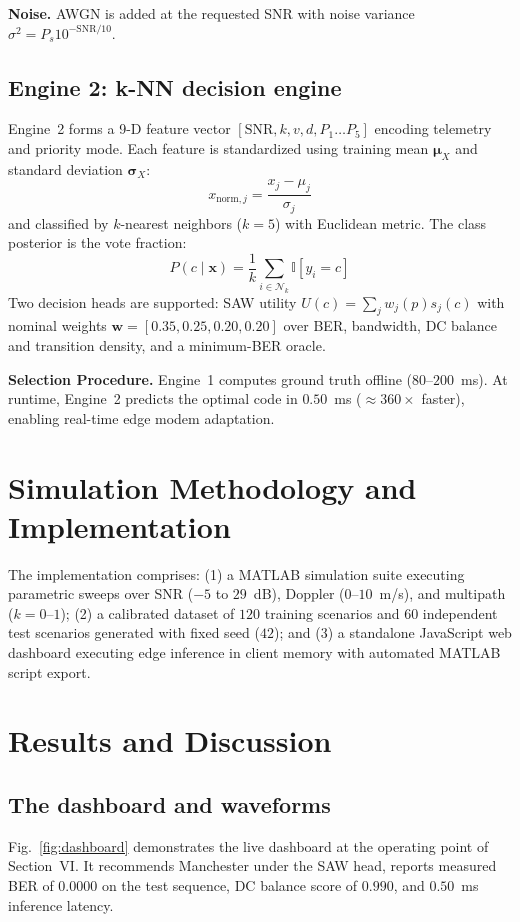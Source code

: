 \documentclass[conference]{IEEEtran}
\begin{document}
\textbf{Noise.} AWGN is added at the requested SNR with noise variance $\sigma^2 = P_s 10^{-\text{SNR}/10}$.

\subsection{Engine 2: k-NN decision engine}
Engine~2 forms a 9-D feature vector $[\text{SNR}, k, v, d, P_1 \dots P_5]$ encoding telemetry and priority mode. Each feature is standardized using training mean $\boldsymbol{\mu}_X$ and standard deviation $\boldsymbol{\sigma}_X$:
\begin{equation}
x_{\text{norm}, j} = \frac{x_j - \mu_j}{\sigma_j}
\end{equation}
and classified by $k$-nearest neighbors ($k=5$) with Euclidean metric. The class posterior is the vote fraction:
\begin{equation}
P(c \mid \mathbf{x}) = \frac{1}{k} \sum_{i \in \mathcal{N}_k} \mathbb{I}[y_i = c]
\end{equation}
Two decision heads are supported: SAW utility $U(c) = \sum_j w_j(p) s_j(c)$ with nominal weights $\mathbf{w} = [0.35, 0.25, 0.20, 0.20]$ over BER, bandwidth, DC balance and transition density, and a minimum-BER oracle.

\textbf{Selection Procedure.} Engine~1 computes ground truth offline ($80$--$200$~ms). At runtime, Engine~2 predicts the optimal code in $0.50$~ms ($\approx 360\times$ faster), enabling real-time edge modem adaptation.

\section{Simulation Methodology and Implementation}
The implementation comprises: (1) a MATLAB simulation suite executing parametric sweeps over SNR ($-5$ to $29$~dB), Doppler ($0$--$10$~m/s), and multipath ($k = 0$--$1$); (2) a calibrated dataset of $120$ training scenarios and $60$ independent test scenarios generated with fixed seed ($42$); and (3) a standalone JavaScript web dashboard executing edge inference in client memory with automated MATLAB script export.

\section{Results and Discussion}

\subsection{The dashboard and waveforms}
Fig.~\ref{fig:dashboard} demonstrates the live dashboard at the operating point of Section~VI. It recommends Manchester under the SAW head, reports measured BER of $0.0000$ on the test sequence, DC balance score of $0.990$, and $0.50$~ms inference latency.
\end{document}
